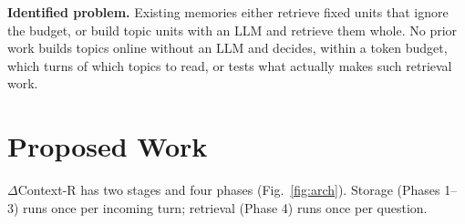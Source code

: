 \documentclass[conference]{IEEEtran}
\newcommand{\dcr}{$\Delta$Context-R}
\begin{document}
\textbf{Identified problem.} Existing memories either retrieve fixed units that
ignore the budget, or build topic units with an LLM and retrieve them whole. No
prior work builds topics online without an LLM and decides, within a token
budget, which turns of which topics to read, or tests what actually makes such
retrieval work.

\section{Proposed Work}
\label{sec:method}

\dcr{} has two stages and four phases (Fig.~\ref{fig:arch}). Storage (Phases
1--3) runs once per incoming turn; retrieval (Phase 4) runs once per question.
\end{document}
